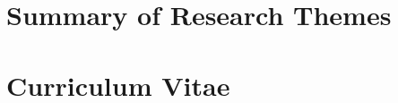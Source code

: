 \documentclass[a4paper,10pt,twoside]{StyleThese}
\begin{document}

%



\clearpage


\appendix
\chapter{Summary of Research Themes}
\label{cha:themes}


\chapter{Curriculum Vitae}
\label{cha:cv}







\end{document}

